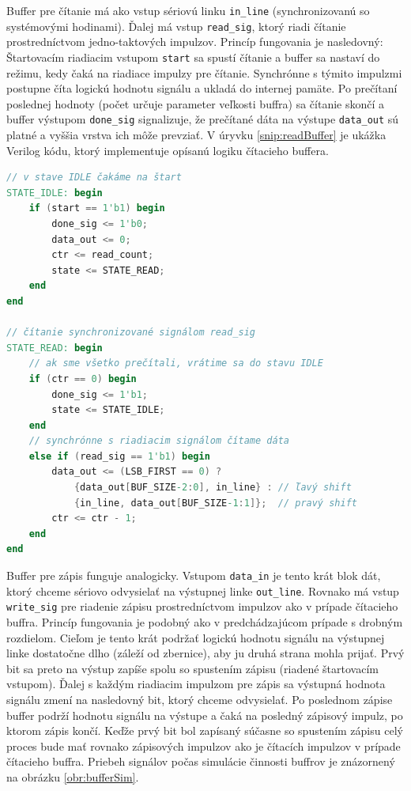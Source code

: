 Buffer pre čítanie má ako vstup sériovú linku \texttt{in\_line} (synchronizovanú so systémovými hodinami). Ďalej má vstup \texttt{read\_sig}, ktorý riadi čítanie prostredníctvom jedno-taktových impulzov. Princíp fungovania je nasledovný: Štartovacím riadiacim vstupom \texttt{start} sa spustí čítanie a buffer sa nastaví do režimu, kedy čaká na riadiace impulzy pre čítanie. Synchrónne s týmito impulzmi postupne číta logickú hodnotu signálu a ukladá do internej pamäte. Po prečítaní poslednej hodnoty (počet určuje parameter veľkosti buffra) sa čítanie skončí a buffer výstupom \texttt{done\_sig} signalizuje, že prečítané dáta na výstupe \texttt{data\_out} sú platné a vyššia vrstva ich môže prevziať. V úryvku \ref{snip:readBuffer} je ukážka Verilog kódu, ktorý implementuje opísanú logiku čítacieho buffera.

\begin{lstlisting}[float,language=Verilog,caption={Verilog kód pre čítací buffer.},label=snip:readBuffer]
// v stave IDLE čakáme na štart
STATE_IDLE: begin
    if (start == 1'b1) begin
        done_sig <= 1'b0;
        data_out <= 0;
        ctr <= read_count;
        state <= STATE_READ;
    end
end
				
// čítanie synchronizované signálom read_sig
STATE_READ: begin
    // ak sme všetko prečítali, vrátime sa do stavu IDLE
    if (ctr == 0) begin
        done_sig <= 1'b1;
        state <= STATE_IDLE;
    end
    // synchrónne s riadiacim signálom čítame dáta
    else if (read_sig == 1'b1) begin
        data_out <= (LSB_FIRST == 0) ?
            {data_out[BUF_SIZE-2:0], in_line} : // ľavý shift
            {in_line, data_out[BUF_SIZE-1:1]};  // pravý shift
        ctr <= ctr - 1;
    end
end
\end{lstlisting}

Buffer pre zápis funguje analogicky. Vstupom \texttt{data\_in} je tento krát blok dát, ktorý chceme sériovo odvysielať na výstupnej linke \texttt{out\_line}. Rovnako má vstup \texttt{write\_sig} pre riadenie zápisu prostredníctvom impulzov ako v prípade čítacieho buffra. Princíp fungovania je podobný ako v predchádzajúcom prípade s drobným rozdielom. Cieľom je tento krát podržať logickú hodnotu signálu na výstupnej linke dostatočne dlho (záleží od zbernice), aby ju druhá strana mohla prijať. Prvý bit sa preto na výstup zapíše spolu so spustením zápisu (riadené štartovacím vstupom). Ďalej s každým riadiacim impulzom pre zápis sa výstupná hodnota signálu zmení na nasledovný bit, ktorý chceme odvysielať. Po poslednom zápise buffer podrží hodnotu signálu na výstupe a čaká na posledný zápisový impulz, po ktorom zápis končí. Keďže prvý bit bol zapísaný súčasne so spustením zápisu celý proces bude mať rovnako zápisových impulzov ako je čítacích impulzov v prípade čítacieho buffra. Priebeh signálov počas simulácie činnosti buffrov je znázornený na obrázku \ref{obr:bufferSim}.

